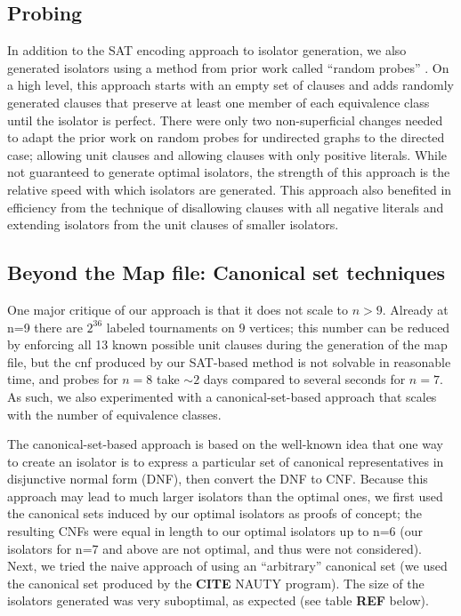 \documentclass[a4paper,UKenglish,cleveref, autoref, thm-restate]{lipics-v2021}
\begin{document}
\subsection{Probing}
In addition to the SAT encoding approach to isolator generation, we also generated isolators using a method from prior work called ``random probes''  \cite{ref_heule}. On a high level, this approach starts with an empty set of clauses and adds randomly generated clauses that preserve at least one member of each equivalence class until the isolator is perfect.  There were only two non-superficial changes needed to adapt the prior work on random probes for undirected graphs to the directed case; allowing unit clauses and allowing clauses with only positive literals. While not guaranteed to generate optimal isolators, the strength of this approach is the relative speed with which isolators are generated. This approach also benefited in efficiency from the technique of disallowing clauses with all negative literals and extending isolators from the unit clauses of smaller isolators.

\subsection{Beyond the Map file: Canonical set techniques}
One major critique of our approach is that it does not scale to $n>9$. Already at n=9 there are $2^36$ labeled tournaments on $9$ vertices; this number can be reduced by enforcing all 13 known possible unit clauses during the generation of the map file, but the cnf produced by our SAT-based method is not solvable in reasonable time, and probes for $n=8$ take $\sim 2$ days compared to several seconds for $n=7$. As such, we also experimented with a canonical-set-based approach that scales with the number of equivalence classes. 

The canonical-set-based approach is based on the well-known idea that one way to create an isolator is to express a particular set of canonical representatives in disjunctive normal form (DNF), then convert the DNF to CNF. Because this approach may lead to much larger isolators than the optimal ones, we first used the canonical sets induced by our optimal isolators as proofs of concept; the resulting CNFs were equal in length to our optimal isolators up to n=6 (our isolators for n=7 and above are not optimal, and thus were not considered). Next, we tried the naive approach of using an ``arbitrary'' canonical set (we used the canonical set produced by the \textbf{CITE}  NAUTY program). The size of the isolators generated was very suboptimal, as expected (see table \textbf{REF} below).
\end{document}
